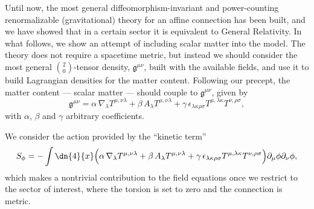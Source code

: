 \documentclass[aps,prl,twocolumn,superscriptaddress,showpacs,showkeys]{revtex4-1}
\begin{document}
Until now, the most general diffeomorphism-invariant and power-counting renormalizable (gravitational) theory for an affine connection has been built, and we have showed that in a certain sector it is equivalent to General Relativity. In what follows, we show an attempt of including scalar matter into the model. The theory does not require a spacetime metric, but instead we should consider the most general $\binom{2}{0}$-tensor density, $\mathfrak{g}^{\mu\nu}$,  built with the available fields, and use it to build Lagrangian densities for the matter content. Following our precept, the matter content --- scalar matter --- should couple to $\mathfrak{g}^{\mu\nu}$, given by %
\begin{dmath}
  \mathfrak{g}^{\mu\nu} = \alpha \, \nabla_\lambda T^{\mu,\nu\lambda} + \beta \, A_\lambda T^{\mu,\nu\lambda} + \gamma \, \epsilon_{\lambda\kappa\rho\sigma} T^{\mu, \lambda\kappa} T^{\nu, \rho\sigma},
\end{dmath}
with $\alpha$, $\beta$ and $\gamma$ arbitrary coefficients.

We consider the action provided by the ``kinetic term''
\begin{dmath}
  \label{ScalarAction}
  S_\phi = -  \int \dn{4}{x} \Big( \alpha \, \nabla_\lambda T^{\mu,\nu\lambda}  + \beta \, A_\lambda T^{\mu,\nu\lambda} + \gamma \, \epsilon_{\lambda\kappa\rho\sigma} T^{\mu, \lambda\kappa} T^{\nu, \rho\sigma} \Big) \partial_\mu\phi\partial_\nu\phi,
\end{dmath}
which makes a nontrivial contribution to the field equations once we restrict to the sector of interest, where the torsion is set to zero and the connection is metric.
\end{document}
